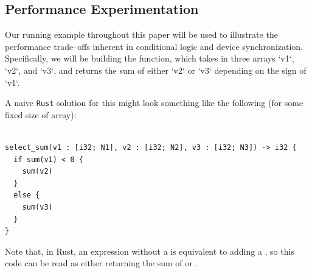 \subsection{Performance Experimentation}
\label{subsec:separation}

Our running example throughout this paper will be used to illustrate the performance trade--offs inherent in conditional logic and device synchronization.  Specifically, we will be building the  function, which takes in three arrays `v1`, `v2`, and `v3`, and returns the sum of either `v2` or `v3` depending on the sign of `v1`.

A naive \texttt{Rust} solution for this might look something like the following (for some fixed size of array):
%
\begin{lstlisting}

select_sum(v1 : [i32; N1], v2 : [i32; N2], v3 : [i32; N3]) -> i32 {
  if sum(v1) < 0 {
    sum(v2)
  }
  else {
    sum(v3)
  }
}
\end{lstlisting}
%
Note that, in Rust, an expression without a \code{;} is equivalent to adding a , so this code can be read as either returning the sum of  or .

